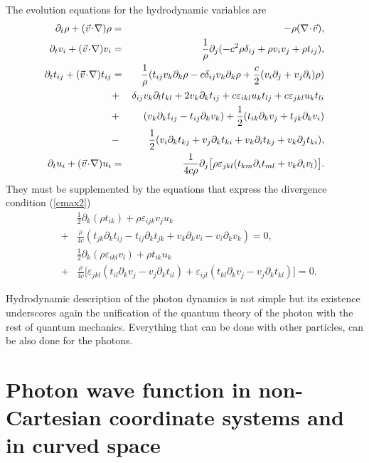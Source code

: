 \documentclass{article}
\begin{document}
The evolution equations for the hydrodynamic variables are
\begin{eqnarray}
  \partial_t\rho + (\vec v\!\cdot\!{\bf\nabla})\rho &=&
  -\rho({\bf\nabla}\!\cdot\!\vec v),\\
  \partial_t v_i + (\vec v\!\cdot\!{\bf\nabla}) v_i &=&
  \frac{1}{\rho}\partial_{j}(-c^2\rho\delta_{ij} +
  \rho v_i v_j +\rho t_{ij}),\\
  \partial_t t_{ij} + (\vec v\!\cdot\!{\bf\nabla}) t_{ij} &=&
  \frac{1}{\rho}(t_{ij}v_k\partial_{k}\rho-
  c\delta_{ij}v_k\partial_{k}\rho+
  \frac{c}{2}(v_i\partial_{j}+v_j\partial_{i})\rho)\nonumber\\
  &+&\delta_{ij}v_k\partial_{l} t_{kl}+2v_k\partial_{k} t_{ij}+
  c\varepsilon_{ikl}u_k t_{lj}+c\varepsilon_{jkl}u_k t_{li}\nonumber\\
  &+&(v_k\partial_{k} t_{ij}-t_{ij}\partial_{k} v_k)+
  \frac{1}{2}(t_{ik}\partial_{k} v_j+t_{jk}\partial_{k} v_i)\nonumber\\
  &-&\frac{1}{2}(v_i\partial_{k} t_{kj}+v_j\partial_{k} t_{ki}+
  v_k\partial_{i} t_{kj}+v_k\partial_{j} t_{ki}),\\
  \partial_t u_i + (\vec v\!\cdot\!{\bf\nabla}) u_i &=&
  \frac{1}{4c\rho}\partial_{j}\bigl[\rho\varepsilon_{jkl}
  (t_{km}\partial_{i} t_{ml} +v_k\partial_{i} v_l)\bigr].
\end{eqnarray}
They must be supplemented by the equations that express the divergence
condition (\ref{cmax2})
\begin{eqnarray}
  &&\frac{1}{2}\partial_{k}(\rho t_{ik})+\rho \varepsilon_{ijk} v_j u_k\\
 &+& \frac{\rho}{4c}(t_{jk}\partial_{k} t_{ij}-t_{ij}\partial_{k} t_{jk}+
  v_k\partial_{k} v_i-v_i\partial_{k} v_k) = 0,\nonumber\\
  &&\frac{1}{2}\partial_{k}(\rho\varepsilon_{ikl}v_l)+\rho t_{ik}u_k\\
 &+& \frac{\rho}{4c}\bigl[\varepsilon_{jkl}(t_{il}\partial_{k} v_j-
  v_j\partial_{k} t_{il})+
  \varepsilon_{ijl}(t_{kl}\partial_{k} v_j-v_j
  \partial_{k} t_{kl})\bigr]=0.\nonumber
\end{eqnarray}

Hydrodynamic description of the photon dynamics is not simple but its
existence underscores again the unification of the quantum theory of the
photon with the rest of quantum mechanics. Everything that can be done with
other particles, can be also done for the photons.

\section[Wave function in curved space]{Photon wave function in
non-Cartesian coordinate systems and in curved space\label{curved}}
\end{document}

